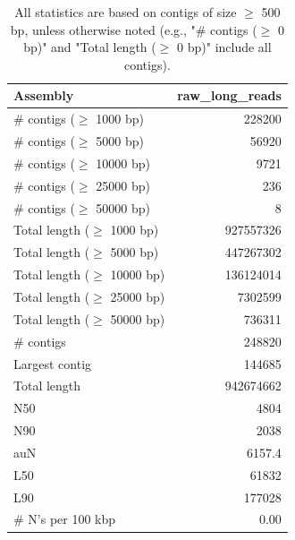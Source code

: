 \documentclass[12pt,a4paper]{article}
\begin{document}
\begin{table}[ht]
\begin{center}
\caption{All statistics are based on contigs of size $\geq$ 500 bp, unless otherwise noted (e.g., "\# contigs ($\geq$ 0 bp)" and "Total length ($\geq$ 0 bp)" include all contigs).}
\begin{tabular}{|l*{1}{|r}|}
\hline
Assembly & raw\_long\_reads \\ \hline
\# contigs ($\geq$ 1000 bp) & 228200 \\ \hline
\# contigs ($\geq$ 5000 bp) & 56920 \\ \hline
\# contigs ($\geq$ 10000 bp) & 9721 \\ \hline
\# contigs ($\geq$ 25000 bp) & 236 \\ \hline
\# contigs ($\geq$ 50000 bp) & 8 \\ \hline
Total length ($\geq$ 1000 bp) & 927557326 \\ \hline
Total length ($\geq$ 5000 bp) & 447267302 \\ \hline
Total length ($\geq$ 10000 bp) & 136124014 \\ \hline
Total length ($\geq$ 25000 bp) & 7302599 \\ \hline
Total length ($\geq$ 50000 bp) & 736311 \\ \hline
\# contigs & 248820 \\ \hline
Largest contig & 144685 \\ \hline
Total length & 942674662 \\ \hline
N50 & 4804 \\ \hline
N90 & 2038 \\ \hline
auN & 6157.4 \\ \hline
L50 & 61832 \\ \hline
L90 & 177028 \\ \hline
\# N's per 100 kbp & 0.00 \\ \hline
\end{tabular}
\end{center}
\end{table}
\end{document}
